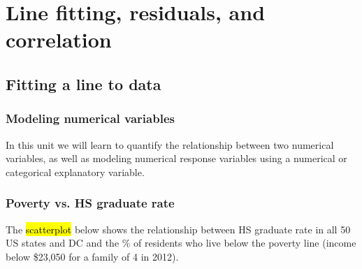 
\section{Line fitting, residuals, and correlation}


\subsection{Fitting a line to data}


\begin{frame}
\frametitle{Modeling numerical variables}

In this unit we will learn to quantify the relationship between two numerical variables, as well as modeling numerical response variables using a numerical or categorical explanatory variable.

\end{frame}


\begin{frame}
\frametitle{Poverty vs. HS graduate rate}

The \hl{scatterplot} below shows the relationship between HS graduate rate in all 50 US states and DC and the \% of residents who live below the poverty line {\small (income below \$23,050 for a family of 4 in 2012)}.

{
\pause
{}
\pause
{}
\pause
{}
\pause
{}
\pause
{}
}

\end{frame}

